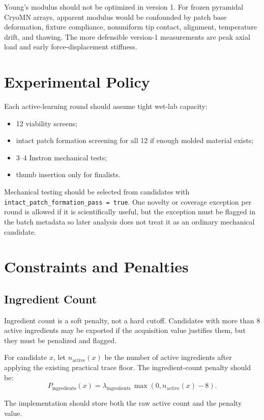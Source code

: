 \documentclass[11pt]{article}
\newcommand{\metric}[1]{\texttt{#1}}
\begin{document}
Young's modulus should not be optimized in version 1. For frozen pyramidal CryoMN
arrays, apparent modulus would be confounded by patch base deformation, fixture
compliance, nonuniform tip contact, alignment, temperature drift, and thawing. The more
defensible version-1 measurements are peak axial load and early force-displacement
stiffness.

\section{Experimental Policy}

Each active-learning round should assume tight wet-lab capacity:
\begin{itemize}
    \item 12 viability screens;
    \item intact patch formation screening for all 12 if enough molded material exists;
    \item 3--4 Instron mechanical tests;
    \item thumb insertion only for finalists.
\end{itemize}

Mechanical testing should be selected from candidates with
\metric{intact\_patch\_formation\_pass = true}. One novelty or coverage exception per
round is allowed if it is scientifically useful, but the exception must be flagged in
the batch metadata so later analysis does not treat it as an ordinary mechanical
candidate.

\section{Constraints and Penalties}

\subsection{Ingredient Count}

Ingredient count is a soft penalty, not a hard cutoff. Candidates with more than 8
active ingredients may be exported if the acquisition value justifies them, but they
must be penalized and flagged.

For candidate $x$, let $n_{\mathrm{active}}(x)$ be the number of active ingredients
after applying the existing practical trace floor. The ingredient-count penalty should
be:
\[
P_{\mathrm{ingredients}}(x)
= \lambda_{\mathrm{ingredients}}\,
\max(0, n_{\mathrm{active}}(x)-8).
\]

The implementation should store both the raw active count and the penalty value.
\end{document}

